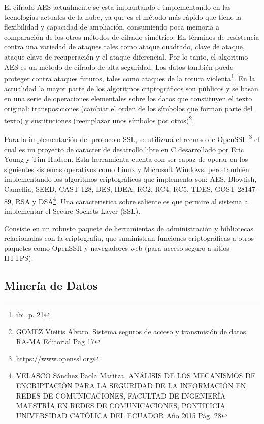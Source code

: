 \documentclass[a4paper,openright,12pt]{book}
\theoremstyle{definition}
\theoremstyle{remark}
\begin{document}
El cifrado AES actualmente se esta implantando e implementando en las tecnologías actuales de la nube, ya que es el método más rápido que tiene la flexibilidad y capacidad de ampliación, consumiendo poca memoria a comparación de los otros métodos de cifrado simétrico. En términos de resistencia contra una variedad de ataques tales como ataque cuadrado, clave de ataque, ataque clave de recuperación y el ataque diferencial. Por lo tanto, el algoritmo AES es un método de cifrado de alta seguridad. Los datos también puede proteger contra ataques futuros, tales como ataques de la rotura violenta\footnote{ibi, p. 21}. En la actualidad la mayor parte de los algoritmos criptográficos son públicos y se basan en una serie de operaciones elementales sobre los datos que constituyen el texto original: transposiciones (cambiar el orden de los símbolos que forman parte del texto) y sustituciones  (reemplazar unos símbolos por otros)\footnote{GOMEZ Vieitis Alvaro. Sistema seguros de acceso y transmisión de datos, RA-MA Editorial Pag 17}.

Para la implementación del protocolo SSL, se utilizará el recurso de OpenSSL \footnote{https://www.openssl.org} el cual es un proyecto de caracter de desarrollo libre en C desarrollado por Eric Young y Tim Hudson. Esta herramienta cuenta con ser capaz de operar en los siguientes sistemas operativos como Linux y
Microsoft Windows, pero también implementando los algoritmos criptográficos que implementa son: AES, Blowfish, Camellia, SEED, CAST-128, DES, IDEA, RC2, RC4, RC5, TDES, GOST 28147-89, RSA y DSA\footnote{
VELASCO Sánchez Paola Maritza, ANÁLISIS DE LOS MECANISMOS DE ENCRIPTACIÓN PARA LA SEGURIDAD DE LA
INFORMACIÓN EN REDES DE COMUNICACIONES, FACULTAD DE INGENIERÍA MAESTRÍA EN REDES DE COMUNICACIONES, PONTIFICIA UNIVERSIDAD CATÓLICA DEL ECUADOR Año 2015 Pàg. 28}. Una caracteristica sobre saliente es que permire al sistema a implementar el Secure Sockets Layer (SSL).

Consiste en un robusto paquete de herramientas de administración y bibliotecas relacionadas con la criptografía, que suministran funciones criptográficas a otros paquetes como OpenSSH y navegadores web (para acceso seguro a sitios HTTPS).

\subsection{Minería de Datos}
\end{document}
